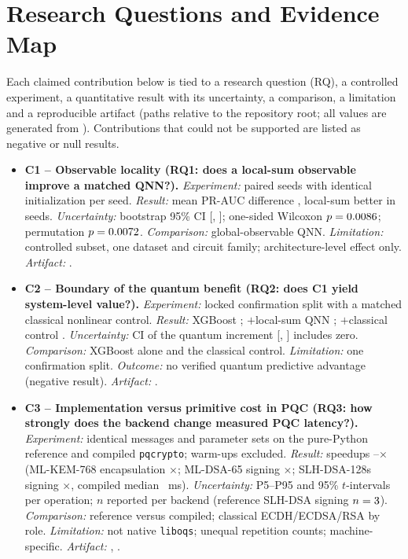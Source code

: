 \section{Research Questions and Evidence Map}\label{sec:evidence}
Each claimed contribution below is tied to a research question (RQ), a controlled experiment, a quantitative result with its uncertainty, a comparison, a limitation and a reproducible artifact (paths relative to the repository root; all values are generated from ). Contributions that could not be supported are listed as negative or null results.

\begin{itemize}
\item \textbf{C1 -- Observable locality (RQ1: does a local-sum observable improve a matched QNN?).} \emph{Experiment:} \LsSeeds{} paired seeds with identical initialization per seed. \emph{Result:} mean PR-AUC difference \LsDelta{}, local-sum better in \LsWins{} seeds. \emph{Uncertainty:} bootstrap 95\% CI [\LsCIlo{}, \LsCIhi{}]; one-sided Wilcoxon $p=0.0086{}$; permutation $p=0.0072{}$. \emph{Comparison:} global-observable QNN. \emph{Limitation:} controlled subset, one dataset and circuit family; architecture-level effect only. \emph{Artifact:} .
\item \textbf{C2 -- Boundary of the quantum benefit (RQ2: does C1 yield system-level value?).} \emph{Experiment:} locked confirmation split with a matched classical nonlinear control. \emph{Result:} XGBoost \CapXgb{}; $+$local-sum QNN \CapXgbLocal{}; $+$classical control \CapXgbControl{}. \emph{Uncertainty:} CI of the quantum increment [\CapCIlo{}, \CapCIhi{}] includes zero. \emph{Comparison:} XGBoost alone and the classical control. \emph{Limitation:} one confirmation split. \emph{Outcome:} no verified quantum predictive advantage (negative result). \emph{Artifact:} .
\item \textbf{C3 -- Implementation versus primitive cost in PQC (RQ3: how strongly does the backend change measured PQC latency?).} \emph{Experiment:} identical messages and parameter sets on the pure-Python reference and compiled \texttt{pqcrypto}; warm-ups excluded. \emph{Result:} speedups \SpeedupMin{}--\SpeedupMax{}$\times$ (ML-KEM-768 encapsulation \SpeedupMlkemEncaps{}$\times$; ML-DSA-65 signing \SpeedupMldsaSign{}$\times$; SLH-DSA-128s signing \SpeedupSlhSSign{}$\times$, compiled median \OptSlhSSignMs{}~ms). \emph{Uncertainty:} P5--P95 and 95\% $t$-intervals per operation; $n$ reported per backend (reference SLH-DSA signing $n=3{}$). \emph{Comparison:} reference versus compiled; classical ECDH/ECDSA/RSA by role. \emph{Limitation:} not native \texttt{liboqs}; unequal repetition counts; machine-specific. \emph{Artifact:} , .

\end{itemize}
